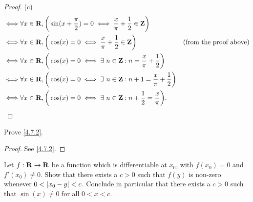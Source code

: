 \begin{proof}{(c)}
\begin{align*}
    \iff & \forall x \in \mathbf{R}, \bigg(\sin(x + \frac{\pi}{2}) = 0 \iff \frac{x}{\pi} + \frac{1}{2} \in \mathbf{Z}\bigg)                                      \\
    \iff & \forall x \in \mathbf{R}, \bigg(\cos(x) = 0 \iff \frac{x}{\pi} + \frac{1}{2} \in \mathbf{Z}\bigg)                      & \text{(from the proof above)} \\
    \iff & \forall x \in \mathbf{R}, \bigg(\cos(x) = 0 \iff \exists\ n \in \mathbf{Z} : n = \frac{x}{\pi} + \frac{1}{2}\bigg)                                     \\
    \iff & \forall x \in \mathbf{R}, \bigg(\cos(x) = 0 \iff \exists\ n \in \mathbf{Z} : n + 1 = \frac{x}{\pi} + \frac{1}{2}\bigg)                                 \\
    \iff & \forall x \in \mathbf{R}, \bigg(\cos(x) = 0 \iff \exists\ n \in \mathbf{Z} : n + \frac{1}{2} = \frac{x}{\pi}\bigg).
  \end{align*}
\end{proof}

\exercisesection

\begin{exercise}\label{ex 4.7.1}
  Prove \cref{4.7.2}.
\end{exercise}

\begin{proof}
  See \cref{4.7.2}.
\end{proof}

\begin{exercise}\label{ex 4.7.2}
  Let \(f : \mathbf{R} \to \mathbf{R}\) be a function which is differentiable at \(x_0\), with \(f(x_0) = 0\) and \(f'(x_0) \neq 0\).
  Show that there exists a \(c > 0\) such that \(f(y)\) is non-zero whenever \(0 < \left\lvert x_0 - y\right\rvert < c\).
  Conclude in particular that there exists a \(c > 0\) such that \(\sin(x) \neq 0\) for all \(0 < x < c\).
\end{exercise}

